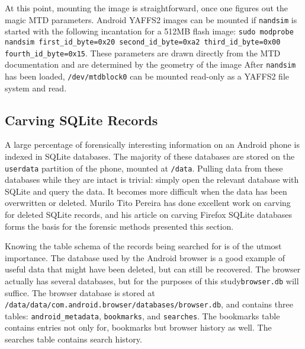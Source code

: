 At this point, mounting the image is straightforward, once one figures out the magic MTD parameters.
Android YAFFS2 images can be mounted if \texttt{nandsim} is started with the following incantation for a 512MB flash image:
\texttt{sudo modprobe nandsim first\_id\_byte=0x20 second\_id\_byte=0xa2 third\_id\_byte=0x00 fourth\_id\_byte=0x15}.
These parameters are drawn directly from the MTD documentation and are determined by the geometry of the image \cite{mtdfaq}
After \texttt{nandsim} has been loaded, \texttt{/dev/mtdblock0} can be mounted read-only as a YAFFS2 file system and read.

\subsection{Carving SQLite Records} A large percentage of forensically interesting information on an Android phone is indexed in
SQLite databases.  The majority of these databases are stored on the \texttt{userdata} partition of the phone, mounted at
\texttt{/data}.  Pulling data from these databases while they are intact is trivial: simply open the relevant database with SQLite
and query the data.  It becomes more difficult when the data has been overwritten or deleted.  Murilo Tito Pereira has done
excellent work on carving for deleted SQLite records, and his article on carving Firefox SQLite databases forms the basis for the
forensic methods presented this section.  \cite{carvefirefox}

Knowing the table schema of the records being searched for is of the utmost importance.  The database used by the Android browser is
a good example of useful data that might have been deleted, but can still be recovered.  The browser actually has several databases,
but for the purposes of this study\texttt{browser.db} will suffice. The browser database is stored at
\texttt{/data/data/com.android.browser/databases/browser.db}, and contains three tables: \texttt{android\_metadata},
\texttt{bookmarks}, and \texttt{searches}.  The bookmarks table contains entries not only for, bookmarks but browser history as well.
The searches table contains search history. 

